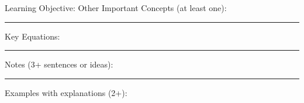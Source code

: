 \documentclass{article}
\theoremstyle{plain}
\theoremstyle{definition}
\theoremstyle{remark}
\begin{document}
\newpage
\noindent \large Learning Objective:
\normalsize
\vskip0.1in
\noindent Other Important Concepts (at least one):
\vspace{0.75in}
\hrule
\vspace{0.1in}
\large \noindent Key Equations:
\normalsize

\vspace{1.25in}
\hrule
\vspace{0.1in}
\large \noindent Notes (3+ sentences or ideas):
\normalsize
\vspace{1.75in}
\hrule
\vspace{0.1in}

\large \noindent Examples with explanations (2+):
\end{document}
